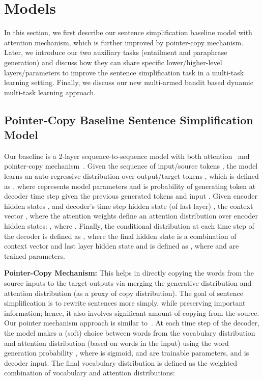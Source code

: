 \documentclass[11pt]{article}
\begin{document}
 

\section{Models}
\label{sec:models}

In this section, we first describe our sentence simplification baseline model with attention mechanism, which is further improved by pointer-copy mechanism. Later, we introduce our two auxiliary tasks (entailment and paraphrase generation) and discuss how they can share specific lower/higher-level layers/parameters to improve the sentence simplification task in a multi-task learning setting. Finally, we discuss our new multi-armed bandit based dynamic multi-task learning approach.

\subsection{Pointer-Copy Baseline Sentence Simplification Model}
Our baseline is a 2-layer sequence-to-sequence model with both attention~\cite{bahdanau2014attention} and pointer-copy mechanism~\cite{see2017get}. Given the sequence of input/source tokens , the model learns an auto-regressive distribution over output/target tokens , which is defined as , 
where  represents model parameters and  is probability of generating token  at decoder time step  given the previous generated tokens  and input . Given encoder hidden states , and decoder's  time step hidden state (of last layer) , the context vector , where the attention weights  define an attention distribution over encoder hidden states: , where .
Finally, the conditional distribution at each time step  of the decoder is defined as , where the final hidden state  is a combination of context vector  and last layer hidden state  and is defined as , where  and  are trained parameters.



\noindent\textbf{Pointer-Copy Mechanism:} This helps in directly copying the words from the source inputs to the target outputs via merging the generative distribution and attention distribution (as a proxy of copy distribution). The goal of sentence simplification is to rewrite sentences more simply, while preserving important information; hence, it also involves significant amount of copying from the source. Our pointer mechanism approach is similar to~. At each time step of the decoder, the model makes a (soft) choice between words from the vocabulary distribution  and attention distribution  (based on words in the input) using the word generation probability , where  is sigmoid,  and  are trainable parameters, and  is decoder input. The final vocabulary distribution is defined as the weighted combination of vocabulary and attention distributions:
\vspace{-5pt}
\end{document}
